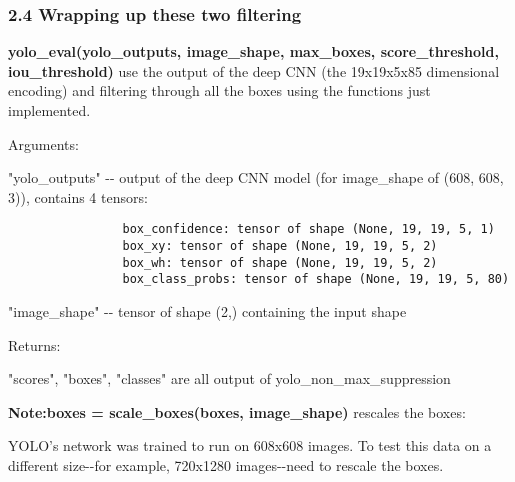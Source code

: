 \documentclass[11pt]{article}
\begin{document}
    \subsubsection{2.4 Wrapping up these two
filtering}\label{wrapping-up-these-two-filtering}

\textbf{yolo\_eval(yolo\_outputs, image\_shape, max\_boxes,
score\_threshold, iou\_threshold)} use the output of the deep CNN (the
19x19x5x85 dimensional encoding) and filtering through all the boxes
using the functions just implemented.

Arguments:

"yolo\_outputs" -\/- output of the deep CNN model (for image\_shape of
(608, 608, 3)), contains 4 tensors:

\begin{verbatim}
                box_confidence: tensor of shape (None, 19, 19, 5, 1)
                box_xy: tensor of shape (None, 19, 19, 5, 2)
                box_wh: tensor of shape (None, 19, 19, 5, 2)
                box_class_probs: tensor of shape (None, 19, 19, 5, 80)
\end{verbatim}

"image\_shape" -\/- tensor of shape (2,) containing the input shape

Returns:

"scores", "boxes", "classes" are all output of
yolo\_non\_max\_suppression

\textbf{Note:boxes = scale\_boxes(boxes, image\_shape)} rescales the
boxes:

YOLO's network was trained to run on 608x608 images. To test this data
on a different size-\/-for example, 720x1280 images-\/-need to rescale
the boxes.
\end{document}
